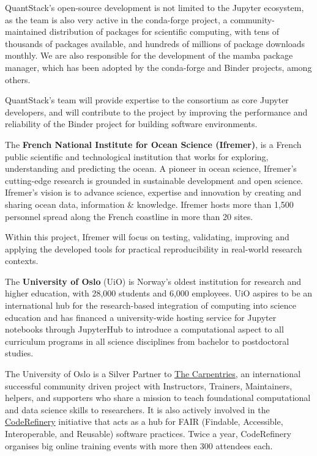 QuantStack's open-source development is not limited to the Jupyter ecosystem, as the team
is also very active in the conda-forge project, a community-maintained distribution
of packages for scientific computing, with tens of thousands of packages available,
and hundreds of millions of package downloads monthly. We are also responsible for
the development of the mamba package manager, which has been adopted by the conda-forge
and Binder projects, among others.

QuantStack's team will provide expertise to the consortium as core Jupyter developers,
and will contribute to the project by improving the performance and reliability of the
Binder project for building software environments.

\medskip \noindent
The \textbf{French National Institute for Ocean Science (Ifremer)}, is a French public
scientific and technological institution that works for exploring, understanding
and predicting the ocean. A pioneer in ocean science, Ifremer's cutting-edge
research is grounded in sustainable development and open science. Ifremer's
vision is to advance science, expertise and innovation by creating and sharing
ocean data, information \& knowledge. Ifremer hosts more than 1,500 personnel
spread along the French coastline in more than 20 sites.

Within this project, Ifremer will focus on testing, validating, improving and
applying the developed
tools for practical reproducibility in real-world research contexts.

\medskip \noindent The \textbf{University of Oslo}
(UiO) is Norway's oldest institution for research and
higher education, with 28,000 students and 6,000 employees. UiO aspires to be an
international hub for the research-based integration of computing into science
education and has financed a university-wide hosting service for Jupyter
notebooks through JupyterHub to introduce a computational aspect to all
curriculum programs in all science disciplines from bachelor to postdoctoral
studies.

The University of Oslo is a Silver Partner to \href{https://carpentries.org}{The
  Carpentries}, an international successful community driven project with
Instructors, Trainers, Maintainers, helpers, and supporters who share a mission
to teach foundational computational and data science skills to researchers. It
is also actively involved in the \href{https://coderefinery.org/}{CodeRefinery}
initiative that acts as a hub for FAIR (Findable, Accessible, Interoperable, and
Reusable) software practices. Twice a year, CodeRefinery organises big online
training events with more then 300 attendees each.

